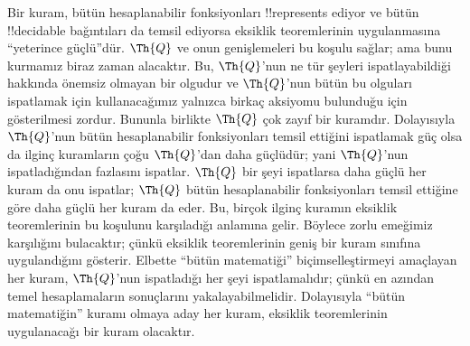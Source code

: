 \documentclass[../../../include/open-logic-section]{subfiles}
\begin{document}
Bir kuram, bütün hesaplanabilir fonksiyonları !!{represents} ediyor ve bütün
!!{decidable} bağıntıları da temsil ediyorsa eksiklik teoremlerinin
uygulanmasına ``yeterince güçlü''dür. $\Th{Q}$ ve onun genişlemeleri bu koşulu sağlar;
ama bunu kurmamız biraz zaman alacaktır. Bu, $\Th{Q}$'nun ne tür şeyleri
ispatlayabildiği hakkında önemsiz olmayan bir olgudur ve $\Th{Q}$'nun bütün
bu olguları ispatlamak için kullanacağımız yalnızca birkaç aksiyomu bulunduğu
için gösterilmesi zordur. Bununla birlikte $\Th{Q}$ çok zayıf bir kuramdır.
Dolayısıyla $\Th{Q}$'nun bütün hesaplanabilir fonksiyonları temsil ettiğini
ispatlamak güç olsa da ilginç kuramların çoğu $\Th{Q}$'dan daha güçlüdür;
yani $\Th{Q}$'nun ispatladığından fazlasını ispatlar. $\Th{Q}$ bir şeyi
ispatlarsa daha güçlü her kuram da onu ispatlar; $\Th{Q}$ bütün
hesaplanabilir fonksiyonları temsil ettiğine göre daha güçlü her kuram da
eder. Bu, birçok ilginç kuramın eksiklik teoremlerinin bu koşulunu karşıladığı
anlamına gelir. Böylece zorlu emeğimiz karşılığını bulacaktır; çünkü
eksiklik teoremlerinin geniş bir kuram sınıfına uygulandığını gösterir.
Elbette ``bütün matematiği'' biçimselleştirmeyi amaçlayan her kuram,
$\Th{Q}$'nun ispatladığı her şeyi ispatlamalıdır; çünkü en azından temel
hesaplamaların sonuçlarını yakalayabilmelidir. Dolayısıyla ``bütün
matematiğin'' kuramı olmaya aday her kuram, eksiklik teoremlerinin
uygulanacağı bir kuram olacaktır.
\end{document}
